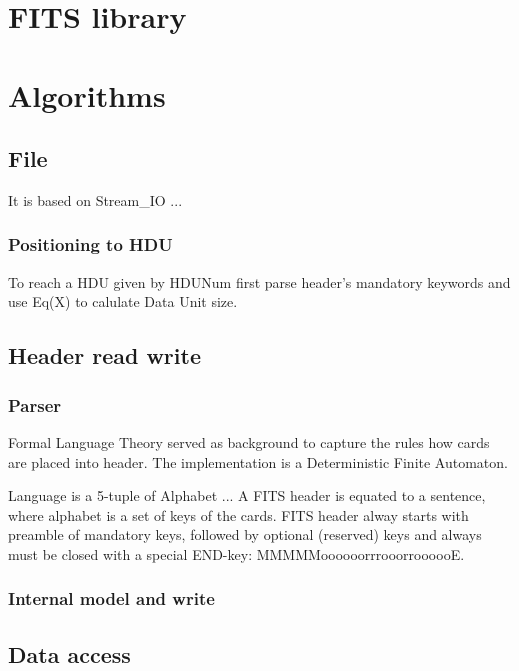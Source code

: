 \documentclass[a4paper,10pt]{article}
\begin{document}
\tableofcontents

\section{FITS library}


\section{Algorithms}



\subsection{File}
It is based on Stream\_IO ...
\subsubsection{Positioning to HDU}

To reach a HDU given by HDUNum first parse header's mandatory keywords and use Eq(X)
to calulate Data Unit size. 



\subsection{Header read write}

\subsubsection{Parser}

Formal Language Theory served as background to capture the rules how cards are placed 
into header. The implementation is a Deterministic Finite Automaton.

Language is a 5-tuple of Alphabet ...
A FITS header is equated to a sentence, where alphabet is a set of keys of the cards.
FITS header alway starts with preamble of mandatory keys, followed by optional (reserved) keys
and always must be closed with a special END-key: MMMMMoooooorrrooorroooooE.


\subsubsection{Internal model and write}



\subsection{Data access}
\end{document}
